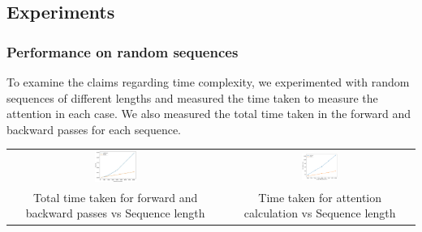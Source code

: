 \documentclass{article}
\begin{document}
\subsection{Experiments}
\subsubsection{Performance on random sequences}
To examine the claims regarding time complexity, we experimented with random sequences of different lengths and measured the time taken to measure the attention in each case. We also measured the total time taken in the forward and backward passes for each sequence.
\begin{center}
    \begin{tabular}{c c}
         \includegraphics[width=0.2\textwidth]{images/forwardpassandbackwardpass.jpg} &
         \includegraphics[width=0.2\textwidth]{images/attentiontimemeasure.png}\\
         \makecell{Total time taken for forward and \\ 
         backward passes vs Sequence length} & 
         \makecell{Time taken for attention \\ calculation vs Sequence length}
    \end{tabular}
\end{center}
\end{document}
